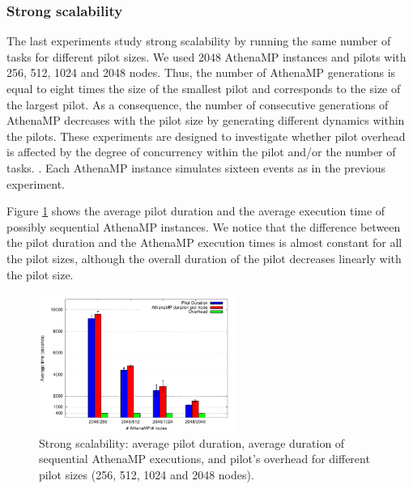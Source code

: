 

\subsubsection{Strong scalability}

The last experiments %
study strong scalability by running the same number of tasks for different pilot sizes. We used
2048 AthenaMP instances and %
pilots with 256, 512, 1024 and 2048 nodes. Thus, the number of AthenaMP generations is equal to eight times the size of the smallest pilot and corresponds to the size of the largest pilot. As a consequence, the number of consecutive generations of AthenaMP decreases with the pilot size by generating different dynamics within the pilots. These experiments are designed to investigate whether pilot overhead is affected by the degree of concurrency within the pilot and/or the number of tasks.  
. Each AthenaMP instance
simulates sixteen events as in the previous experiment.

Figure \ref{fig:strongScala} %
shows the average pilot duration and the average execution time of possibly
sequential AthenaMP instances.  We %
notice that the difference between the pilot duration and the AthenaMP execution
times is almost constant for all the pilot sizes, although the overall duration
of the pilot decreases linearly with the pilot size.

\begin{figure}[!htb]
        \includegraphics[height=4.5cm,width=\columnwidth]{./figures/NGE/strong.pdf}
    \caption{Strong scalability:  average pilot duration, average duration of
    sequential AthenaMP executions, and pilot's overhead for different pilot
    sizes (256, 512, 1024 and 2048 nodes).}
\label{fig:strongScala}
\end{figure}


